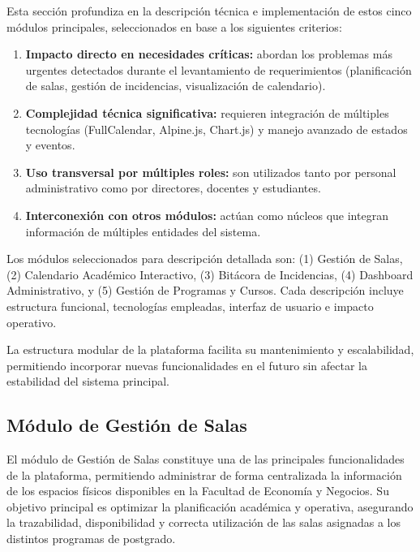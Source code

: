 Esta sección profundiza en la descripción técnica e implementación de estos cinco módulos principales, seleccionados en base a los siguientes criterios:

\begin{enumerate}
    \item \textbf{Impacto directo en necesidades críticas:} abordan los problemas más urgentes detectados durante el levantamiento de requerimientos (planificación de salas, gestión de incidencias, visualización de calendario).
    \item \textbf{Complejidad técnica significativa:} requieren integración de múltiples tecnologías (FullCalendar, Alpine.js, Chart.js) y manejo avanzado de estados y eventos.
    \item \textbf{Uso transversal por múltiples roles:} son utilizados tanto por personal administrativo como por directores, docentes y estudiantes.
    \item \textbf{Interconexión con otros módulos:} actúan como núcleos que integran información de múltiples entidades del sistema.
\end{enumerate}

Los módulos seleccionados para descripción detallada son: (1) Gestión de Salas, (2) Calendario Académico Interactivo, (3) Bitácora de Incidencias, (4) Dashboard Administrativo, y (5) Gestión de Programas y Cursos. Cada descripción incluye estructura funcional, tecnologías empleadas, interfaz de usuario e impacto operativo.

La estructura modular de la plataforma facilita su mantenimiento y escalabilidad, permitiendo incorporar nuevas funcionalidades en el futuro sin afectar la estabilidad del sistema principal.

\subsection{Módulo de Gestión de Salas}

El módulo de Gestión de Salas constituye una de las principales funcionalidades de la plataforma, permitiendo administrar de forma centralizada la información de los espacios físicos disponibles en la Facultad de Economía y Negocios. Su objetivo principal es optimizar la planificación académica y operativa, asegurando la trazabilidad, disponibilidad y correcta utilización de las salas asignadas a los distintos programas de postgrado.

